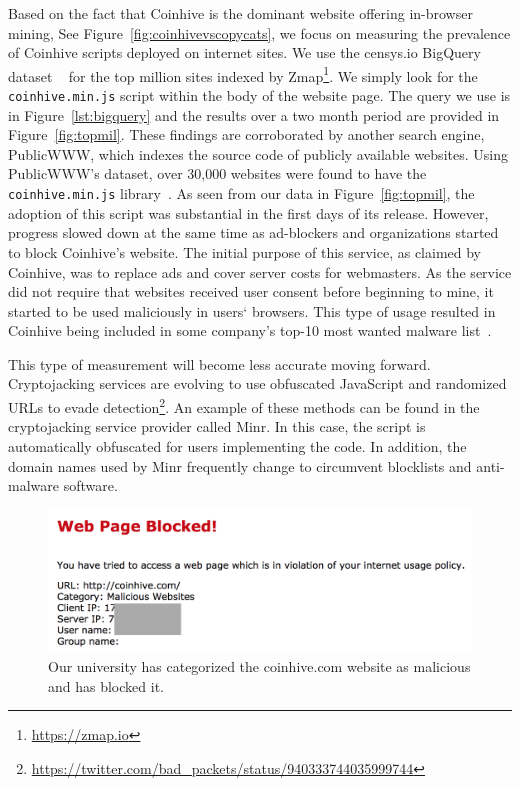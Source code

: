 Based on the fact that Coinhive is the dominant website offering in-browser mining, See Figure~\ref{fig:coinhivevscopycats}, we focus on measuring the prevalence of Coinhive scripts deployed on internet sites. We use the censys.io BigQuery dataset ~\cite{censys15} for the top million sites indexed by Zmap\footnote{\url{https://zmap.io}}. We simply look for the \texttt{coinhive.min.js} script within the body of the website page. The query we use is in Figure~\ref{lst:bigquery} and the results over a two month period are provided in Figure~\ref{fig:topmil}. These findings are corroborated by another search engine, PublicWWW, which indexes the source code of publicly available websites. Using PublicWWW's dataset, over 30,000 websites were found to have the \texttt{coinhive.min.js} library~\cite{badpacketspublicwww}. As seen from our data in Figure~\ref{fig:topmil}, the adoption of this script was substantial in the first days of its release. However, progress slowed down at the same time as ad-blockers and organizations started to block Coinhive's website. The initial purpose of this service, as claimed by Coinhive, was to replace ads and cover server costs for webmasters. As the service did not require that websites received user consent before beginning to mine, it started to be used maliciously in users` browsers. This type of usage resulted in Coinhive being included in some company's top-10 most wanted malware list~\cite{checkpoint}.

This type of measurement will become less accurate moving forward. Cryptojacking services are evolving to use obfuscated JavaScript and randomized URLs to evade detection\footnote{\url{https://twitter.com/bad_packets/status/940333744035999744}}. An example of these methods can be found in the cryptojacking service provider called Minr. In this case, the script is automatically obfuscated for users implementing the code. In addition, the domain names used by Minr frequently change to circumvent blocklists and anti-malware software.

\begin{figure}[t]
\centering
\includegraphics[width=0.9\linewidth]{figures/coinhive_blocked.png}
\caption{Our university has categorized the coinhive.com website as malicious and has blocked it.\label{fig:concordia}}
\end{figure}

